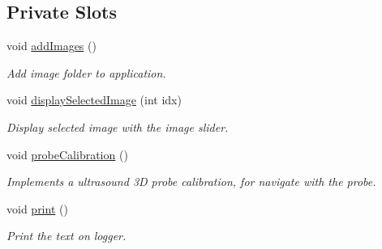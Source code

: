 \subsection*{Private Slots}
\begin{DoxyCompactItemize}
\item 
void \hyperlink{class_main_window_afdd9e98dfe3d68ab08aed2df37e8c1dc}{add\-Images} ()
\begin{DoxyCompactList}\small\item\em Add image folder to application. \end{DoxyCompactList}\item 
void \hyperlink{class_main_window_a67ec1c2d082b1b5a63347df9660275f1}{display\-Selected\-Image} (int idx)
\begin{DoxyCompactList}\small\item\em Display selected image with the image slider. \end{DoxyCompactList}\item 
void \hyperlink{class_main_window_a7a01aa3ba0210c1915d53d37d7272a13}{probe\-Calibration} ()
\begin{DoxyCompactList}\small\item\em Implements a ultrasound 3\-D probe calibration, for navigate with the probe. \end{DoxyCompactList}\item 
void \hyperlink{class_main_window_a873aaee370c1456b99f1a2399ff13691}{print} ()
\begin{DoxyCompactList}\small\item\em Print the text on logger. \end{DoxyCompactList}\end{DoxyCompactItemize}
